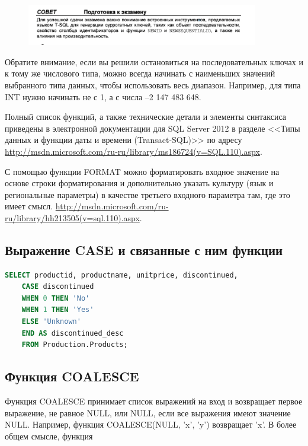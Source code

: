 \begin{figure}[h!]
	\begin{center}
		\includegraphics[width=0.9\textwidth]{img/advice1.png}
	\end{center}
	\captionsetup{justification=centering}
\end{figure}

Обратите внимание, если вы решили остановиться на последовательных ключах и к тому же числового типа, можно всегда начинать с наименьших значений выбранного типа данных, чтобы использовать весь диапазон. Например, для типа INT нужно начинать не с 1, а с числа –2 147 483 648. 

Полный список функций, а также технические детали и элементы синтаксиса приведены в электронной документации для SQL Server 2012 в разделе <<Типы данных и функции даты и времени (Transact-SQL)>> по адресу \url{http://msdn.microsoft.com/ru-ru/library/ms186724(v=SQL.110).aspx}.

С помощью функции FORMAT можно форматировать входное значение на основе строки форматирования и дополнительно указать культуру (язык и региональные параметры) в качестве третьего входного параметра там, где это имеет смысл. \url{http://msdn.microsoft.com/ru-ru/library/hh213505(v=sql.110).aspx}.

\subsection{Выражение CASE и связанные с ним функции}

\begin{lstlisting}[label=lst:funcReturn, caption=Пример работы CASE, language=sql]
	SELECT productid, productname, unitprice, discontinued,
	CASE discontinued
	WHEN 0 THEN 'No'
	WHEN 1 THEN 'Yes'
	ELSE 'Unknown'
	END AS discontinued_desc
	FROM Production.Products; 
\end{lstlisting}


\subsection{Функция COALESCE}


Функция COALESCE принимает список выражений на вход и возвращает первое выражение, не равное NULL, или NULL, если все выражения имеют значение NULL. Например, функция COALESCE(NULL, 'x', 'y') возвращает 'x'. В более общем смысле,
функция

